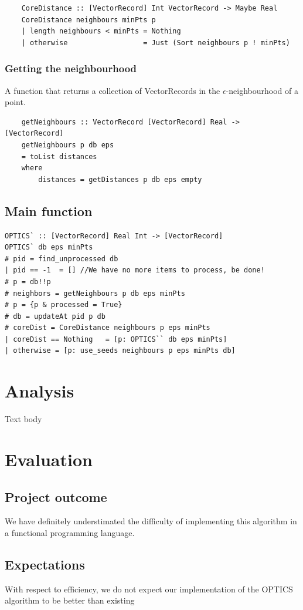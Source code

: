 \documentclass[12pt,a4paper]{article}
\begin{document}
\begin{verbatim}
    CoreDistance :: [VectorRecord] Int VectorRecord -> Maybe Real
    CoreDistance neighbours minPts p
    | length neighbours < minPts = Nothing
    | otherwise                  = Just (Sort neighbours p ! minPts)
\end{verbatim}

\subsubsection{Getting the neighbourhood}
A function that returns a collection of VectorRecords in the $\epsilon$-neighbourhood of a point.
\begin{verbatim}
    getNeighbours :: VectorRecord [VectorRecord] Real -> [VectorRecord]
    getNeighbours p db eps
    = toList distances
    where
        distances = getDistances p db eps empty
\end{verbatim}

\subsection{Main function}
\begin{verbatim}
OPTICS` :: [VectorRecord] Real Int -> [VectorRecord]
OPTICS` db eps minPts
# pid = find_unprocessed db
| pid == -1  = [] //We have no more items to process, be done!
# p = db!!p
# neighbors = getNeighbours p db eps minPts
# p = {p & processed = True}
# db = updateAt pid p db
# coreDist = CoreDistance neighbours p eps minPts
| coreDist == Nothing   = [p: OPTICS`` db eps minPts]
| otherwise = [p: use_seeds neighbours p eps minPts db]
\end{verbatim}

\clearpage
\section{Analysis}
Text body

\section{Evaluation}
\subsection{Project outcome}
We have definitely understimated the difficulty of implementing this algorithm in a functional programming language.
\subsection{Expectations}
With respect to efficiency, we do not expect our implementation of the OPTICS algorithm to be better than existing 
\end{document}
